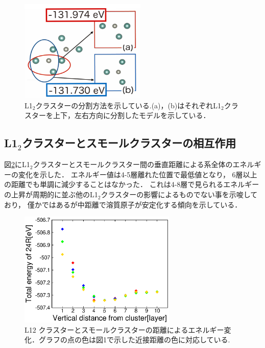 \documentclass[a4j,twocolumn]{jsarticle}
\begin{document}
\begin{figure}[h]
\vspace{-2.0\baselineskip}
\begin{center}
   \includegraphics[width=60mm]{./dividing_cluster.png}
  \caption{L1$_2$クラスターの分割方法を示している.(a)，(b)はそれぞれL1$_2$クラスターを上下，左右方向に分割したモデルを示している．}
  \label{fig:two}
\end{center}
\end{figure}
\vspace{-2.0\baselineskip}

\subsection{L1$_2$クラスターとスモールクラスターの相互作用}
図\ref{fig:three}にL1$_2$クラスターとスモールクラスター間の垂直距離による系全体のエネルギーの変化を示した．
エネルギー値は4-5層離れた位置で最低値となり，
6層以上の距離でも単調に減少することはなかった．
これは4-8層で見られるエネルギーの上昇が周期的に並ぶ他のL1$_2$クラスターの影響によるものでない事を示唆しており，
僅かではあるが中距離で溶質原子が安定化する傾向を示している．

\begin{figure}[H]
\begin{center}
   \includegraphics[width=75mm]{./smallcluster_Alld_JPS2017.eps}
  \caption{L1$2$ クラスターとスモールクラスターの距離によるエネルギー変化．グラフの点の色は図1で示した近接距離の色に対応している.}
  \label{fig:three}
\end{center}
\end{figure}
\end{document}
